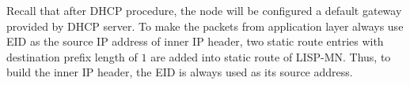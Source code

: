 Recall that after DHCP procedure, the node will be configured a default gateway provided by DHCP server. To make the packets from application layer always use EID as the source IP address of inner IP header, two static route entries with destination prefix length of $1$ %
are added into static route of LISP-MN. Thus, to build the inner IP header, the EID is always used as its source address.



